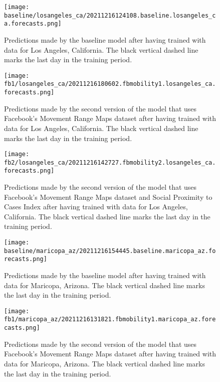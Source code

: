 
\begin{figure}[!htb]
    \centering
    \texttt{[image: baseline/losangeles\_ca/20211216124108.baseline.losangeles\_ca.forecasts.png]}
    \caption{Predictions made by the baseline model after having trained with data for Los Angeles, California. The black vertical dashed line marks the last day in the training period.}
    \label{fig:predictions-losangeles-baseline}
\end{figure}

\begin{figure}[!htb]
    \centering
    \texttt{[image: fb1/losangeles\_ca/20211216180602.fbmobility1.losangeles\_ca.forecasts.png]}
    \caption{Predictions made by the second version of the model that uses Facebook's Movement Range Maps dataset after having trained with data for Los Angeles, California. The black vertical dashed line marks the last day in the training period.}
    \label{fig:predictions-losangeles-fb1}
\end{figure}

\begin{figure}[!htb]
    \centering
    \texttt{[image: fb2/losangeles\_ca/20211216142727.fbmobility2.losangeles\_ca.forecasts.png]}
    \caption{Predictions made by the second version of the model that uses Facebook's Movement Range Maps dataset and Social Proximity to Cases Index after having trained with data for Los Angeles, California. The black vertical dashed line marks the last day in the training period.}
    \label{fig:predictions-losangeles-fb2}
\end{figure}


\begin{figure}[!htb]
    \centering
    \texttt{[image: baseline/maricopa\_az/20211216154445.baseline.maricopa\_az.forecasts.png]}
    \caption{Predictions made by the baseline model after having trained with data for Maricopa, Arizona. The black vertical dashed line marks the last day in the training period.}
    \label{fig:predictions-maricopa-baseline}
\end{figure}

\begin{figure}[!htb]
    \centering
    \texttt{[image: fb1/maricopa\_az/20211216131821.fbmobility1.maricopa\_az.forecasts.png]}
    \caption{Predictions made by the second version of the model that uses Facebook's Movement Range Maps dataset after having trained with data for Maricopa, Arizona. The black vertical dashed line marks the last day in the training period.}
    \label{fig:predictions-maricopa-fb1}
\end{figure}

